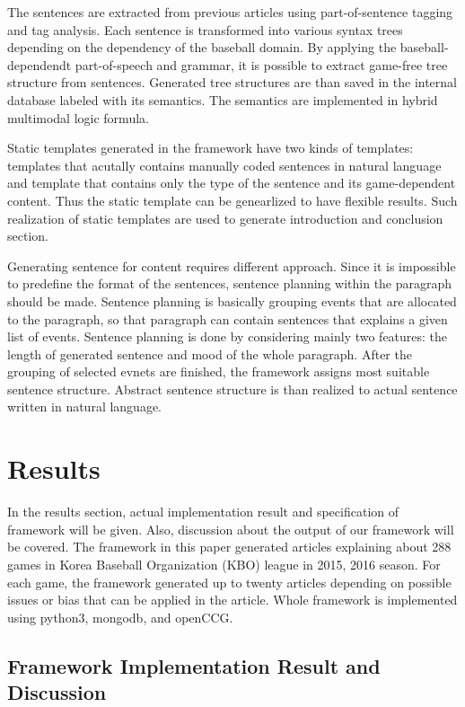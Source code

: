\documentclass[11pt,letterpaper]{article}
\begin{document}
The sentences are extracted from previous articles using part-of-sentence tagging and tag analysis. Each sentence is transformed into various syntax trees depending on the dependency of the baseball domain. By applying the baseball-dependendt part-of-speech and grammar, it is possible to extract game-free tree structure from sentences. Generated tree structures are than saved in the internal database labeled with its semantics. The semantics are implemented in hybrid multimodal logic formula. 

Static templates generated in the framework have two kinds of templates: templates that acutally contains manually coded sentences in natural language and template that contains only the type of the sentence and its game-dependent content. Thus the static template can be genearlized to have flexible results. Such realization of static templates are used to generate introduction and conclusion section. 

Generating sentence for content requires different approach. Since it is impossible to predefine the format of the sentences, sentence planning within the paragraph should be made. Sentence planning is basically grouping events that are allocated to the paragraph, so that paragraph can contain sentences that explains a given list of events. Sentence planning is done by considering mainly two features: the length of generated sentence and mood of the whole paragraph. After the grouping of selected evnets are finished, the framework assigns most suitable sentence structure. Abstract sentence structure is than realized to actual sentence written in natural language. 


\section{Results} 

In the results section, actual implementation result and specification of framework will be given. Also, discussion about the output of our framework will be covered. The framework in this paper generated articles explaining about 288 games in Korea Baseball Organization (KBO) league in 2015, 2016 season. For each game, the framework generated up to twenty articles depending on possible issues or bias that can be applied in the article. Whole framework is implemented using python3, mongodb, and openCCG. 

\subsection{Framework Implementation Result and Discussion}
\end{document}
